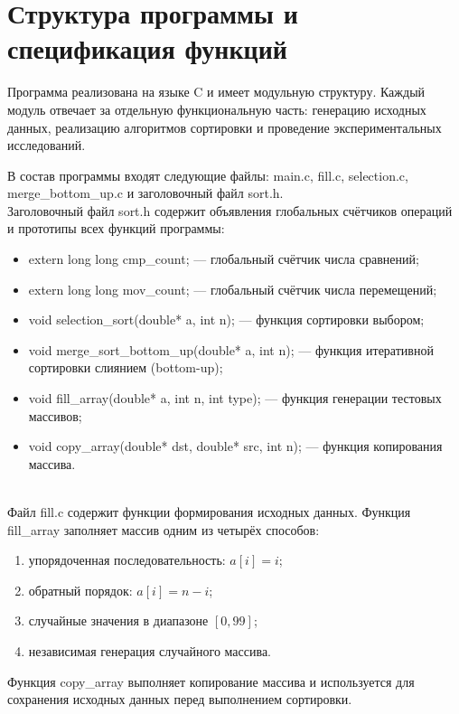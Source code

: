\documentclass[a4paper,12pt]{article}
\newcommand{\code}[1]{{\ttfamily #1}}
\begin{document}
\section{Структура программы и спецификация функций}

Программа реализована на языке C и имеет модульную структуру. Каждый модуль
отвечает за отдельную функциональную часть: генерацию исходных данных,
реализацию алгоритмов сортировки и проведение экспериментальных исследований.

В состав программы входят следующие файлы: \code{main.c}, \code{fill.c},
\code{selection.c}, \code{merge\_bottom\_up.c} и заголовочный файл \code{sort.h}.\\

Заголовочный файл \code{sort.h} содержит объявления глобальных счётчиков операций и
прототипы всех функций программы:
\begin{itemize}
\item \code{extern long long cmp\_count;} — глобальный счётчик числа сравнений;
\item \code{extern long long mov\_count;} — глобальный счётчик числа перемещений;
\item \code{void selection\_sort(double* a, int n);} — функция сортировки выбором;
\item \code{void merge\_sort\_bottom\_up(double* a, int n);} — функция итеративной сортировки слиянием (bottom-up);
\item \code{void fill\_array(double* a, int n, int type);} — функция генерации тестовых массивов;
\item \code{void copy\_array(double* dst, double* src, int n);} — функция копирования массива.
\end{itemize}\\

Файл \code{fill.c} содержит функции формирования исходных данных.
Функция \code{fill\_array} заполняет массив одним из четырёх способов:
\begin{enumerate}
\item упорядоченная последовательность: $a[i] = i$;
\item обратный порядок: $a[i] = n - i$;
\item случайные значения в диапазоне $[0, 99]$;
\item независимая генерация случайного массива.
\end{enumerate}

Функция \code{copy\_array} выполняет копирование массива и используется для
сохранения исходных данных перед выполнением сортировки.\\
\end{document}
